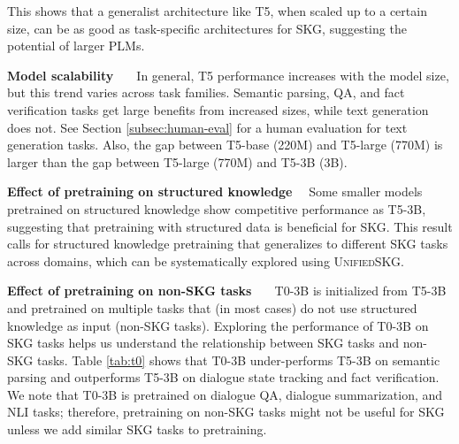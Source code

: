 This shows that a generalist architecture like T5, when scaled up to a certain size, can be as good as task-specific architectures for SKG, suggesting the potential of larger PLMs. 

\textbf{Model scalability \ \ } In general, T5 performance increases with the model size, but this trend varies across task families. Semantic parsing, QA, and fact verification tasks get large benefits from increased sizes, while text generation does not. See Section \ref{subsec:human-eval} for a human evaluation for text generation tasks. Also, the gap between T5-base (220M) and T5-large (770M) is larger than the gap between T5-large (770M) and T5-3B (3B). 

\textbf{Effect of pretraining on structured knowledge} \ \
Some smaller models pretrained on structured knowledge \cite{liu2021tapex} show competitive performance as T5-3B, suggesting that pretraining with structured data is beneficial for SKG. This result calls for structured knowledge pretraining that generalizes to different SKG tasks across domains, which can be systematically explored using \textsc{Unified}SKG. 

\textbf{Effect of pretraining on non-SKG tasks \ \ } T0-3B \cite{sanh2021multitask} is initialized from T5-3B and pretrained on multiple tasks that (in most cases) do not use structured knowledge as input (non-SKG tasks). Exploring the performance of T0-3B on SKG tasks helps us understand the relationship between SKG tasks and non-SKG tasks. Table \ref{tab:t0} shows that T0-3B under-performs T5-3B on semantic parsing and outperforms T5-3B on dialogue state tracking and fact verification. We note that T0-3B is pretrained on dialogue QA, dialogue summarization, and NLI tasks; therefore, pretraining on non-SKG tasks might not be useful for SKG unless we add similar SKG tasks to pretraining. 

